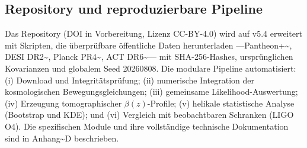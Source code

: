 ﻿\documentclass[11pt,letterpaper]{article}
\begin{document}
\begin{table}[htbp]
  \centering
  \small
  \caption{Einheitliches Symbolverzeichnis (Dissertation v5.4).}
  \label{tab:simb}
\end{table}
\subsection{Repository und reproduzierbare Pipeline}
Das Repository (DOI in Vorbereitung, Lizenz CC-BY-4.0) wird auf v5.4 erweitert mit Skripten, die überprüfbare öffentliche Daten herunterladen ---Pantheon+\textasciitilde{}\cite{Brout2022}, DESI DR2\textasciitilde{}\cite{Lodha2025}, Planck PR4\textasciitilde{}\cite{Sullivan2025}, ACT DR6\textasciitilde{}\cite{DiegoPalazuelos2025}--- mit SHA-256-Hashes, ursprünglichen Kovarianzen und globalem Seed 20260808. Die modulare Pipeline automatisiert: (i) Download und Integritätsprüfung; (ii) numerische Integration der kosmologischen Bewegungsgleichungen; (iii) gemeinsame Likelihood-Auswertung; (iv) Erzeugung tomographischer $\beta(z)$-Profile; (v) helikale statistische Analyse (Bootstrap und KDE); und (vi) Vergleich mit beobachtbaren Schranken (LIGO O4). Die spezifischen Module und ihre vollständige technische Dokumentation sind in Anhang\textasciitilde{}D beschrieben.
\end{document}
